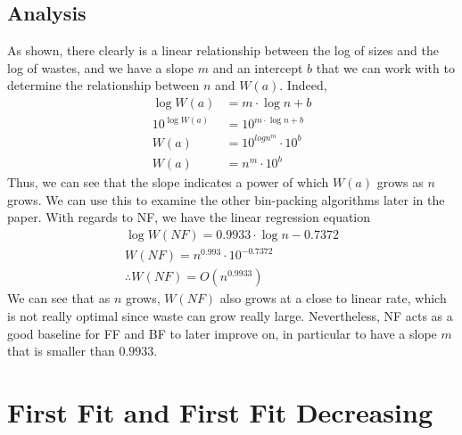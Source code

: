 \documentclass{article}
\begin{document}
\subsection{Analysis}
    As shown, there clearly is a linear relationship between the log of sizes
    and the log of wastes, and we have a slope $m$ and an intercept $b$ that we
    can work with to determine the relationship between $n$ and $W(a)$. Indeed,
    \begin{align*}
        \log{W(a)} &= m \cdot \log{n} + b \\
        10^{\log{W(a)}} &= 10^{m \cdot \log{n} + b} \\
        W(a) &= 10^{log{n}^m} \cdot 10^{b} \\
        W(a) &= n^{m} \cdot 10^{b}
    \end{align*}
    \noindent Thus, we can see that the slope indicates a power of which $W(a)$
    grows as $n$ grows. We can use this to examine the other bin-packing
    algorithms later in the paper. 
    \nextblurb
    With regards to NF, we have the linear regression equation 
    \begin{align*}
        \log{W(NF)} = 0.9933 \cdot \log{n} - 0.7372 \\
        W(NF) = n^{0.993} \cdot 10^{-0.7372} \\
        \therefore \boxed{W(NF) = O\left( n^{0.9933} \right)}
    \end{align*}
    \noindent We can see that as $n$ grows, $W(NF)$ also grows at a close to
    linear rate, which is not really optimal since waste can grow really large.
    Nevertheless, NF acts as a good baseline for FF and BF to later improve on,
    in particular to have a slope $m$ that is smaller than $0.9933$.
\section{First Fit and First Fit Decreasing}
\end{document}
